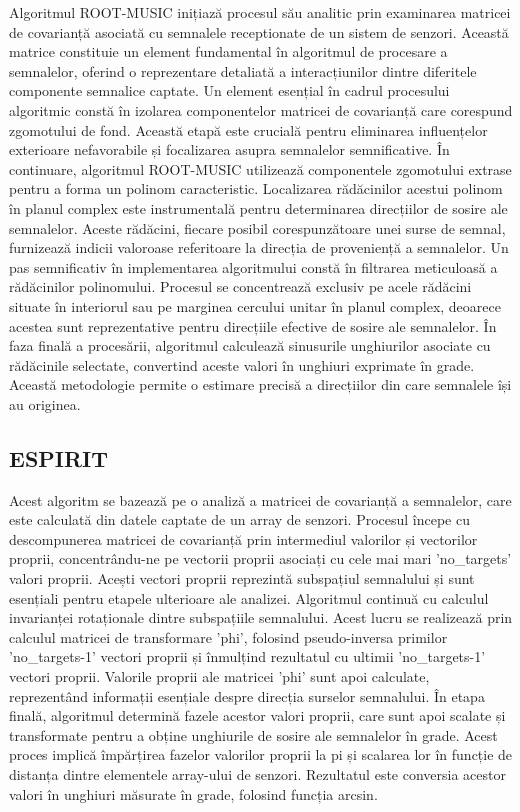\documentclass{article}
\begin{document}
Algoritmul ROOT-MUSIC inițiază procesul său analitic prin examinarea matricei de covarianță asociată cu semnalele receptionate de un sistem de senzori. Această matrice constituie un element fundamental în algoritmul de procesare a semnalelor, oferind o reprezentare detaliată a interacțiunilor dintre diferitele componente semnalice captate.
Un element esențial în cadrul procesului algoritmic constă în izolarea componentelor matricei de covarianță care corespund zgomotului de fond. Această etapă este crucială pentru eliminarea influențelor exterioare nefavorabile și focalizarea asupra semnalelor semnificative.
În continuare, algoritmul ROOT-MUSIC utilizează componentele zgomotului extrase pentru a forma un polinom caracteristic. Localizarea rădăcinilor acestui polinom în planul complex este instrumentală pentru determinarea direcțiilor de sosire ale semnalelor. Aceste rădăcini, fiecare posibil corespunzătoare unei surse de semnal, furnizează indicii valoroase referitoare la direcția de proveniență a semnalelor.
Un pas semnificativ în implementarea algoritmului constă în filtrarea meticuloasă a rădăcinilor polinomului. Procesul se concentrează exclusiv pe acele rădăcini situate în interiorul sau pe marginea cercului unitar în planul complex, deoarece acestea sunt reprezentative pentru direcțiile efective de sosire ale semnalelor.
În faza finală a procesării, algoritmul calculează sinusurile unghiurilor asociate cu rădăcinile selectate, convertind aceste valori în unghiuri exprimate în grade. Această metodologie permite o estimare precisă a direcțiilor din care semnalele își au originea. \cite{rootmusic1}\cite{rootmusic2}

\subsection{ESPIRIT}

Acest algoritm se bazează pe o analiză a matricei de covarianță a semnalelor, care este calculată din datele captate de un array de senzori.
Procesul începe cu descompunerea matricei de covarianță prin intermediul valorilor și vectorilor proprii, concentrându-ne pe vectorii proprii asociați cu cele mai mari 'no\_targets' valori proprii. Acești vectori proprii reprezintă subspațiul semnalului și sunt esențiali pentru etapele ulterioare ale analizei.
Algoritmul continuă cu calculul invarianței rotaționale dintre subspațiile semnalului. Acest lucru se realizează prin calculul matricei de transformare 'phi', folosind pseudo-inversa primilor 'no\_targets-1' vectori proprii și înmulțind rezultatul cu ultimii 'no\_targets-1' vectori proprii. Valorile proprii ale matricei 'phi' sunt apoi calculate, reprezentând informații esențiale despre direcția surselor semnalului.
În etapa finală, algoritmul determină fazele acestor valori proprii, care sunt apoi scalate și transformate pentru a obține unghiurile de sosire ale semnalelor în grade. Acest proces implică împărțirea fazelor valorilor proprii la pi și scalarea lor în funcție de distanța dintre elementele array-ului de senzori. Rezultatul este conversia acestor valori în unghiuri măsurate în grade, folosind funcția arcsin. \cite{espirit1}\cite{espirit2}\cite{espirit3}
\end{document}
